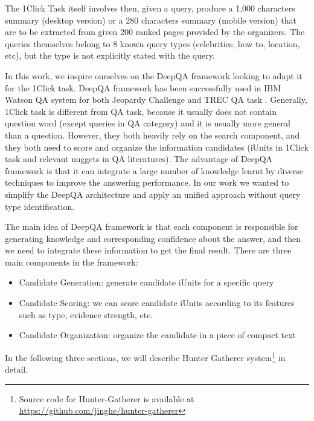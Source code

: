 The 1Click Task itself involves then, given a query, produce a 1,000
characters summary (desktop version) or a 280 characters summary
(mobile version) that are to be extracted from given 200 ranked pages
provided by the organizers. The queries themselves belong to 8 known
query types (celebrities, how to, location, etc), but the type is not
explicitly stated with the query.


In this work, we inspire ourselves on the DeepQA framework looking to adapt it for the 1Click task.
DeepQA framework has been successfully used in IBM Watson QA system for both Jeopardy Challenge and TREC QA task \cite{ferrucci_etal_AI10}.
Generally, 1Click task is different from QA task, because it usually does not contain question word (except queries in QA category) and it is usually more general than a question.
However, they both heavily rely on the search component, and they both need to score and organize the information candidates (iUnits in 1Click task and relevant nuggets in QA literatures).
The advantage of DeepQA framework is that it can integrate a large number of knowledge learnt by diverse techniques to improve the answering performance. In our work we wanted to simplify the DeepQA architecture and apply an unified approach without query type identification.

The main idea of DeepQA framework is that each component is responsible for generating knowledge and corresponding confidence about the answer, and then we need to integrate these information to get the final result.
There are three main components in the framework:

\begin{itemize}
\item Candidate Generation: generate candidate iUnits for a specific query
\item Candidate Scoring: we can score candidate iUnits according to its features such as type, evidence strength, etc.
\item Candidate Organization: organize the candidate in a piece of compact text
\end{itemize}

In the following three sections, we will describe Hunter Gatherer system\footnote{Source code for Hunter-Gatherer is available at \url{https://github.com/jinghe/hunter-gatherer}} in detail.

